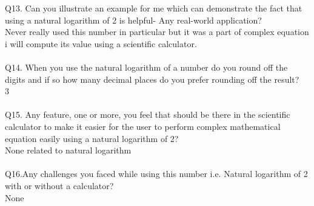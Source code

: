 \documentclass[12pt]{article}
\begin{document}
Q13. Can you illustrate an example for me which can demonstrate the fact that using a natural logarithm of 2 is helpful- Any real-world application?\\
Never really used this number in particular but it was a part of complex equation i will compute its value using a scientific calculator.\\\\
Q14. When you use the natural logarithm of a number do you round off the digits and if so how many decimal places do you prefer rounding off the result? \\
3\\\\
Q15. Any feature, one or more, you feel that should be there in the scientific calculator to make it easier for the user to perform complex mathematical equation easily using a natural logarithm of 2?\\
None related to natural logarithm\\\\
Q16.Any challenges you faced while using this number i.e. Natural logarithm of 2 with or without a calculator?\\
None\\
\end{document}
